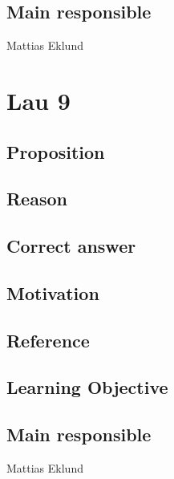 \documentclass[a4paper]{article}
\begin{document}
	\subsection{Main responsible}
		Mattias Eklund

\section{Lau 9}
	\subsection{Proposition}

	\subsection{Reason}

	\subsection{Correct answer}

	\subsection{Motivation}

	\subsection{Reference}

	\subsection{Learning Objective}

	\subsection{Main responsible}
		Mattias Eklund
\end{document}
